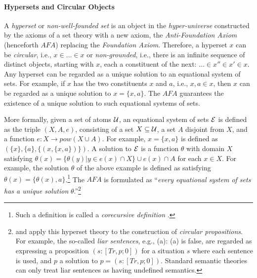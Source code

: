 \paragraph{Hypersets and Circular Objects}
A {\it hyperset} or {\it non-well-founded set} \cite{Acz87} is an object in the {\it hyper-universe} constructed by the axioms of a set theory with a new axiom, the {\it Anti-Foundation Axiom} (henceforth $AFA$) replacing the {\it Foundation Axiom}.
Therefore, a hyperset $x$ can be {\it circular}, i.e., $x\in \ldots \in x$ or {\it non-grounded}, i.e., there is an infinite sequence of distinct objects, starting with $x$, each a constituent of the next: $\ldots \in x''\in x'\in x$.
Any hyperset can be regarded as a unique solution to an equational system of sets.
For example, if $x$ has the two constituents $x$ and $a$, i.e., $x,a\in x$, then $x$ can be regarded as a unique solution to $x=\{x,a\}$.
The $AFA$ guarantees the existence of a unique solution to such equational systems of sets.
\par
More formally, given a set of atoms ${\cal U}$, an equational system of sets ${\cal E}$ is defined as the triple $(X,A,e)$, consisting of a set $X\subseteq {\cal U}$, a set $A$ disjoint from $X$, and a function $e:X\to pow(X\cup A)$.
For example, $x=\{x,a\}$ is defined as $(\{x\},\{a\},\{(x,\{x,a\})\})$.
A solution to ${\cal E}$ is a function $\theta$ with domain $X$ satisfying $\theta(x)=\{\theta(y)|y\in e(x)\cap X\}\cup e(x)\cap A$ for each $x\in X$.
For example, the solution $\theta$ of the above example is defined as satisfying $\theta(x)=\{\theta(x),a\}$.\<\footnote{
Such a definition is called a {\it corecursive definition} \cite{BM96}.}
The $AFA$ is formulated as ``{\it every equational system of sets has a unique solution} $\theta$.''\<\footnote{
\cite{BE87} and \cite{Bar89} apply this hyperset theory to the construction of {\it circular propositions}.
For example, the so-called {\it liar sentences}, e.g., (a): (a) is false, 
are regarded as expressing a proposition $(s:[Tr,p;0])$ for a situation $s$ where each sentence is used, and $p$ a solution to $p=(s:[Tr,p;0])$.
Standard semantic theories can only treat liar sentences as having undefined semantics.
}
